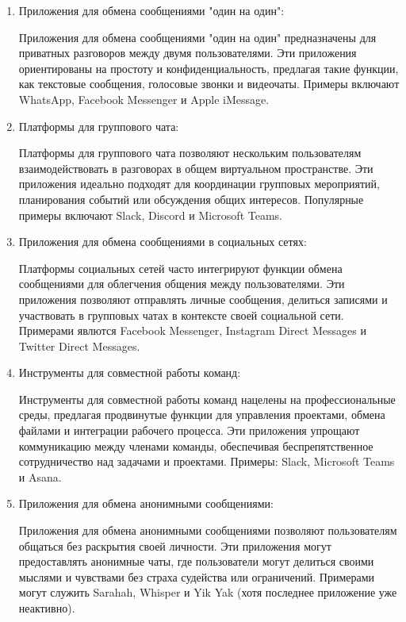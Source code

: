 \begin{enumerate}
	\item Приложения для обмена сообщениями "один на один":
	
	Приложения для обмена сообщениями "один на один" предназначены для приватных разговоров между двумя пользователями. Эти приложения ориентированы на простоту и конфиденциальность, предлагая такие функции, как текстовые сообщения, голосовые звонки и видеочаты. Примеры включают WhatsApp, Facebook Messenger и Apple iMessage.
	
	\item Платформы для группового чата:
	
	Платформы для группового чата позволяют нескольким пользователям взаимодействовать в разговорах в общем виртуальном пространстве. Эти приложения идеально подходят для координации групповых мероприятий, планирования событий или обсуждения общих интересов. Популярные примеры включают Slack, Discord и Microsoft Teams.
	
	\item Приложения для обмена сообщениями в социальных сетях:
	
	Платформы социальных сетей часто интегрируют функции обмена сообщениями для облегчения общения между пользователями. Эти приложения позволяют отправлять личные сообщения, делиться записями и участвовать в групповых чатах в контексте своей социальной сети. Примерами явлются Facebook Messenger, Instagram Direct Messages и Twitter Direct Messages.
	
	\item Инструменты для совместной работы команд:
	
	Инструменты для совместной работы команд нацелены на профессиональные среды, предлагая продвинутые функции для управления проектами, обмена файлами и интеграции рабочего процесса. Эти приложения упрощают коммуникацию между членами команды, обеспечивая беспрепятственное сотрудничество над задачами и проектами. Примеры: Slack, Microsoft Teams и Asana.
	
	\item Приложения для обмена анонимными сообщениями:
	
	Приложения для обмена анонимными сообщениями позволяют пользователям общаться без раскрытия своей личности. Эти приложения могут предоставлять анонимные чаты, где пользователи могут делиться своими мыслями и чувствами без страха судейства или ограничений. Примерами могут служить Sarahah, Whisper и Yik Yak (хотя последнее приложение уже неактивно).
	

\end{enumerate}
